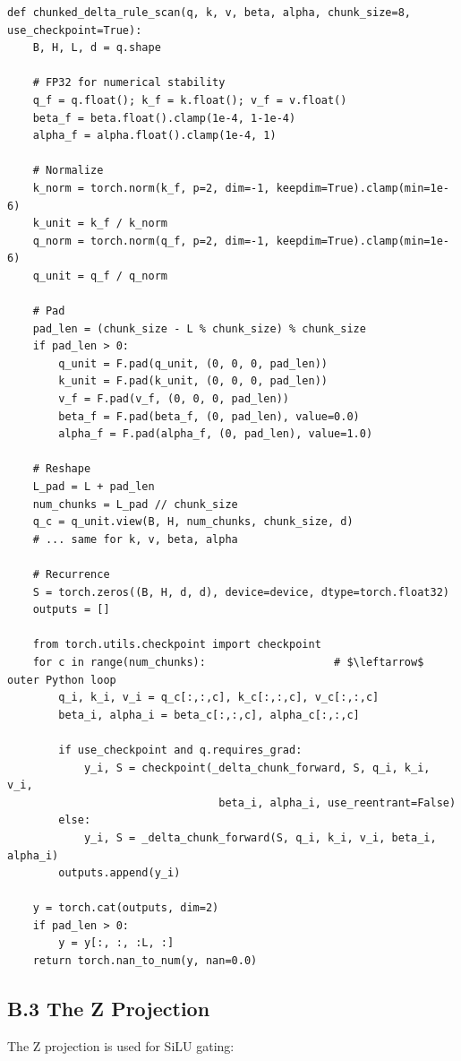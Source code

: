 \begin{lstlisting}
def chunked_delta_rule_scan(q, k, v, beta, alpha, chunk_size=8, use_checkpoint=True):
    B, H, L, d = q.shape
    
    # FP32 for numerical stability
    q_f = q.float(); k_f = k.float(); v_f = v.float()
    beta_f = beta.float().clamp(1e-4, 1-1e-4)
    alpha_f = alpha.float().clamp(1e-4, 1)
    
    # Normalize
    k_norm = torch.norm(k_f, p=2, dim=-1, keepdim=True).clamp(min=1e-6)
    k_unit = k_f / k_norm
    q_norm = torch.norm(q_f, p=2, dim=-1, keepdim=True).clamp(min=1e-6)
    q_unit = q_f / q_norm
    
    # Pad
    pad_len = (chunk_size - L % chunk_size) % chunk_size
    if pad_len > 0:
        q_unit = F.pad(q_unit, (0, 0, 0, pad_len))
        k_unit = F.pad(k_unit, (0, 0, 0, pad_len))
        v_f = F.pad(v_f, (0, 0, 0, pad_len))
        beta_f = F.pad(beta_f, (0, pad_len), value=0.0)
        alpha_f = F.pad(alpha_f, (0, pad_len), value=1.0)
    
    # Reshape
    L_pad = L + pad_len
    num_chunks = L_pad // chunk_size
    q_c = q_unit.view(B, H, num_chunks, chunk_size, d)
    # ... same for k, v, beta, alpha
    
    # Recurrence
    S = torch.zeros((B, H, d, d), device=device, dtype=torch.float32)
    outputs = []
    
    from torch.utils.checkpoint import checkpoint
    for c in range(num_chunks):                    # $\leftarrow$ outer Python loop
        q_i, k_i, v_i = q_c[:,:,c], k_c[:,:,c], v_c[:,:,c]
        beta_i, alpha_i = beta_c[:,:,c], alpha_c[:,:,c]
        
        if use_checkpoint and q.requires_grad:
            y_i, S = checkpoint(_delta_chunk_forward, S, q_i, k_i, v_i, 
                                 beta_i, alpha_i, use_reentrant=False)
        else:
            y_i, S = _delta_chunk_forward(S, q_i, k_i, v_i, beta_i, alpha_i)
        outputs.append(y_i)
    
    y = torch.cat(outputs, dim=2)
    if pad_len > 0:
        y = y[:, :, :L, :]
    return torch.nan_to_num(y, nan=0.0)
\end{lstlisting}

\subsection{B.3 The Z Projection}

The Z projection is used for SiLU gating:


